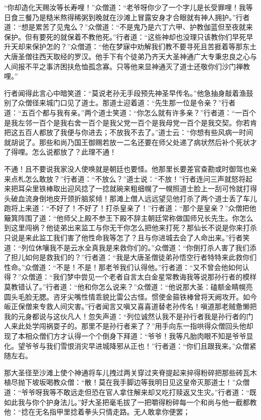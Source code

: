 \documentclass[12pt,UTF8]{ctexbook}
\begin{document}
“你却造化天赐汝等长寿哩！”众僧道：“老爷呀你少了一个字儿是长受罪哩！我等日食三餐乃是糙米熬得稀粥到晚就在沙滩上冒露安身才合眼就有神人拥护。”行者道：“想是累苦了见鬼么？”众僧道：“不是鬼乃是六丁六甲、护教伽蓝但至夜就来保护。但有要死的就保着不教他死。”行者道：“这些神却也没理只该教你们早死早升天却来保护怎的？”众僧道：“他在梦寐中劝解我们教不要寻死且苦捱着等那东土大唐圣僧往西天取经的罗汉。他手下有个徒弟乃齐天大圣神通广大专秉忠良之心与人间报不平之事济困扶危恤孤念寡。只等他来显神通灭了道士还敬你们沙门禅教哩。”

行者闻得此言心中暗笑道：“莫说老孙无手段预先神圣早传名。”他急抽身敲着渔鼓别了众僧径来城门口见了道士。那道士迎着道：“先生那一位是令亲？”行者道：“五百个都与我有亲。”两个道士笑道：“你怎么就有许多亲？”行者道：“一百个是我左邻一百个是我右舍一百个是我父党一百个是我母党一百个是我交契。你若肯把这五百人都放了我便与你进去；不放我不去了。”道士云：“你想有些风病一时间就胡说了。那些和尚乃国王御赐若放一二名还要在师父处递了病状然后补个死状才了得哩。怎么说都放了？此理不通！

不通！且不要说我家没人使唤就是朝廷也要怪。他那里长要差官查勘或时御驾也亲来点札怎么敢放？”行者道：“不放么？”道士说：“不放！”行者连问三声就怒将起来把耳朵里铁棒取出迎风捻了一捻就碗来粗细幌了一幌照道士脸上一刮可怜就打得头破血流身倒地皮开颈折脑浆倾！那滩上僧人远远望见他打杀了两个道士丢了车儿跑将上来道：“不好了！不好了！打杀皇亲了！”行者道：“那个是皇亲？”众僧把他簸箕阵围了道：“他师父上殿不参王下殿不辞主朝廷常称做国师兄长先生。你怎么到这里闯祸？他徒弟出来监工与你无干你怎么把他来打死？那仙长不说是你来打杀只说是来此监工我们害了他性命我等怎了？且与你进城去会了人命出来。”行者笑道：“列位休嚷我不是云水全真我是来救你们的。”众僧道：“你倒打杀人害了我们添了担儿如何是救我们的？”行者道：“我是大唐圣僧徒弟孙悟空行者特特来此救你们性命。”众僧道：“不是！不是！那老爷我们认得他。”行者道：“又不曾会他如何认得？”众僧道：“我们梦中尝见一个老者自言太白金星常教诲我等说那孙行者的模样莫教错认了。”行者道：“他和你怎么说来？”众僧道：“他说那大圣：磕额金睛幌亮圆头毛脸无腮。咨牙尖嘴性情乖貌比雷公古怪。惯使金箍铁棒曾将天阙攻开。如今皈正保僧来专救人间灾害。”行者闻言又嗔又喜喜道替老孙传名！嗔道那老贼惫懒把我的元身都说与这伙凡人！忽失声道：“列位诚然认我不是孙行者我是孙行者的门人来此处学闯祸耍子的。那里不是孙行者来了？”用手向东一指哄得众僧回头他却现了本相众僧们方才认得一个个倒身下拜道：“爷爷！我等凡胎肉眼不知是爷爷显化。望爷爷与我们雪恨消灾早进城降邪从正也！”行者道：“你们且跟我来。”众僧紧随左右。

那大圣径至沙滩上使个神通将车儿拽过两关穿过夹脊提起来捽得粉碎把那些砖瓦木植尽抛下坡坂喝教众僧：“散！莫在我手脚边等我明日见这皇帝灭那道士！”众僧道：“爷爷呀我等不敢远走但恐在官人拿住解来却又吃打赎返又生灾。”行者道：“既如此我与你个护身法儿。”好大圣把毫毛拔了一把嚼得粉碎每一个和尚与他一截都教他：“捻在无名指甲里捻着拳头只情走路。无人敢拿你便罢；
\end{document}

